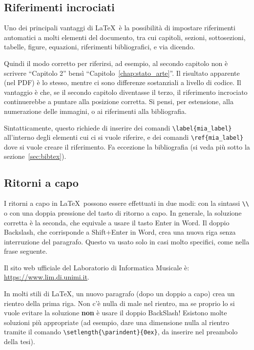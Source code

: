 \documentclass[12pt]{report}
\begin{document}
\subsection{Riferimenti incrociati}

Uno dei principali vantaggi di \LaTeX\ è la possibilità di impostare riferimenti automatici a molti elementi del documento, tra cui capitoli, sezioni, sottosezioni, tabelle, figure, equazioni, riferimenti bibliografici, e via dicendo.

Quindi il modo corretto per riferirsi, ad esempio, al secondo capitolo non è scrivere ``Capitolo 2'' bensì ``Capitolo~\ref{chap:stato_arte}''. Il risultato apparente (nel PDF) è lo stesso, mentre ci sono differenze sostanziali a livello di codice. Il vantaggio è che, se il secondo capitolo diventasse il terzo, il riferimento incrociato continuerebbe a puntare alla posizione corretta. Si pensi, per estensione, alla numerazione delle immagini, o ai riferimenti alla bibliografia.

Sintatticamente, questo richiede di inserire dei comandi \verb|\label{mia_label}| all'interno degli elementi cui ci si vuole riferire, e dei comandi \verb|\ref{mia_label}| dove si vuole creare il riferimento. Fa eccezione la bibliografia (si veda pi\`u sotto la sezione~\ref{sec:bibtex}).


\subsection{Ritorni a capo}

I ritorni a capo in \LaTeX\ possono essere effettuati in due modi: con la sintassi \verb|\\| o con una doppia pressione del tasto di ritorno a capo. In generale, la soluzione corretta è la seconda, che equivale a usare il tasto Enter in Word. Il doppio Backslash, che corrisponde a Shift+Enter in Word, crea una nuova riga senza interruzione del paragrafo. Questo va usato solo in casi molto specifici, come nella frase seguente.

Il sito web ufficiale del Laboratorio di Informatica Musicale è:\\
\url{https://www.lim.di.unimi.it}.

In molti stili di \LaTeX, un nuovo paragrafo (dopo un doppio a capo) crea un rientro della prima riga. Non c'\`e nulla di male nel rientro, ma se proprio lo si vuole evitare la soluzione \textbf{non} \`e usare il doppio BackSlash! Esistono molte soluzioni pi\`u appropriate (ad esempio, dare una dimensione nulla al rientro tramite il comando \verb|\setlength{\parindent}{0ex}|, da inserire nel preambolo della tesi).
\end{document}

